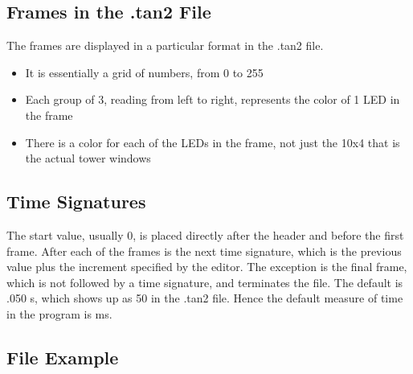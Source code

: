 \documentclass[12pt]{extarticle}
\begin{document}
\subsection{Frames in the .tan2 File}
The frames are displayed in a particular format in the .tan2 file.
	\begin{itemize}
		\item It is essentially a grid of numbers, from 0 to 255
		\item Each group of 3, reading from left to right, represents the color of 1 LED in the frame
		\item There is a color for each of the LEDs in the frame, not just the 10x4 that is the actual tower windows
	\end{itemize}

\subsection{Time Signatures}
The start value, usually 0, is placed directly after the header and before the first frame.  After each of the frames is the next time signature, which is the previous value plus the increment specified by the editor.  The exception is the final frame, which is not followed by a time signature, and terminates the file.  The default is .050 s, which shows up as 50 in the .tan2 file.  Hence the default measure of time in the program is ms.

\subsection{File Example}
\end{document}
